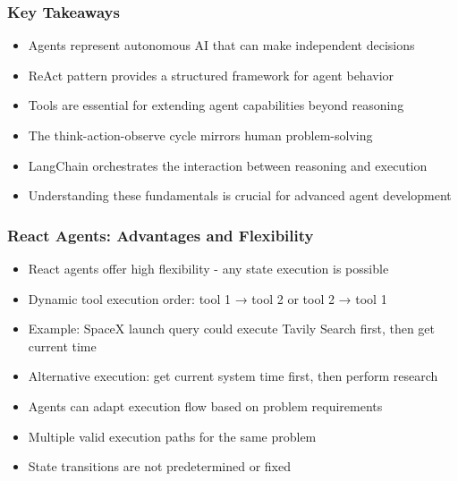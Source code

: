 \begin{frame}[fragile]\frametitle{Key Takeaways}
      \begin{itemize}
        \item Agents represent autonomous AI that can make independent decisions
        \item ReAct pattern provides a structured framework for agent behavior
        \item Tools are essential for extending agent capabilities beyond reasoning
        \item The think-action-observe cycle mirrors human problem-solving
        \item LangChain orchestrates the interaction between reasoning and execution
        \item Understanding these fundamentals is crucial for advanced agent development
      \end{itemize}
\end{frame}

\begin{frame}[fragile]\frametitle{React Agents: Advantages and Flexibility}
      \begin{itemize}
        \item React agents offer high flexibility - any state execution is possible
        \item Dynamic tool execution order: tool 1 → tool 2 or tool 2 → tool 1
        \item Example: SpaceX launch query could execute Tavily Search first, then get current time
        \item Alternative execution: get current system time first, then perform research
        \item Agents can adapt execution flow based on problem requirements
        \item Multiple valid execution paths for the same problem
        \item State transitions are not predetermined or fixed
      \end{itemize}
\end{frame}


